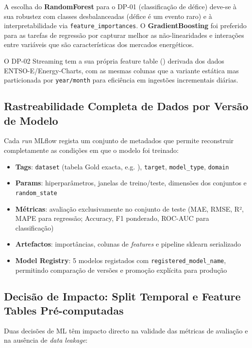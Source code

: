 \documentclass[11pt,a4paper]{article}
\begin{document}
A escolha do \textbf{RandomForest} para o DP-01 (classificação de défice) deve-se à sua robustez com classes desbalanceadas (défice é um evento raro) e à interpretabilidade via \texttt{feature\_importances}. O \textbf{GradientBoosting} foi preferido para as tarefas de regressão por capturar melhor as não-linearidades e interações entre variáveis que são características dos mercados energéticos.

O DP-02 Streaming tem a sua própria feature table () derivada dos dados ENTSO-E/Energy-Charts, com as mesmas colunas que a variante estática mas particionada por \texttt{year/month} para eficiência em ingestões incrementais diárias.

\subsection{Rastreabilidade Completa de Dados por Versão de Modelo}

Cada \textit{run} MLflow regista um conjunto de metadados que permite reconstruir completamente as condições em que o modelo foi treinado:

\begin{itemize}[leftmargin=*,noitemsep]
  \item \textbf{Tags}: \texttt{dataset} (tabela Gold exacta, e.g. ), \texttt{target}, \texttt{model\_type}, \texttt{domain}
  \item \textbf{Params}: hiperparâmetros, janelas de treino/teste, dimensões dos conjuntos e \texttt{random\_state}
  \item \textbf{Métricas}: avaliação exclusivamente no conjunto de teste (MAE, RMSE, R², MAPE para regressão; Accuracy, F1 ponderado, ROC-AUC para classificação)
  \item \textbf{Artefactos}: importâncias, colunas de \textit{features} e pipeline sklearn serializado
  \item \textbf{Model Registry}: 5 modelos registados com \texttt{registered\_model\_name}, permitindo comparação de versões e promoção explícita para produção
\end{itemize}

\subsection{Decisão de Impacto: Split Temporal e Feature Tables Pré-computadas}

Duas decisões de ML têm impacto directo na validade das métricas de avaliação e na ausência de \textit{data leakage}:
\end{document}
